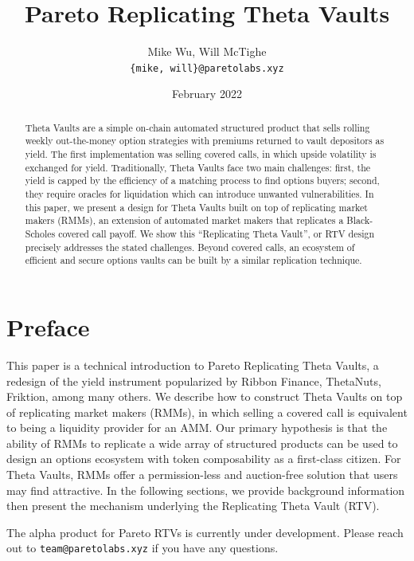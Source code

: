 \documentclass[hidelinks, 12pt]{article}
\title{Pareto Replicating Theta Vaults}
\author{Mike Wu, Will McTighe \\ \small\texttt{\{mike, will\}@paretolabs.xyz}}
\date{February 2022}
\begin{document}
\maketitle

\tableofcontents

\begin{abstract}
Theta Vaults are a simple on-chain automated structured product that sells rolling weekly out-the-money option strategies with premiums returned to vault depositors as yield. The first implementation was selling covered calls, in which upside volatility is exchanged for yield.
Traditionally, Theta Vaults face two main challenges: first, the yield is capped by the efficiency of a matching process to find options buyers; second, they require oracles for liquidation which can introduce unwanted vulnerabilities.
In this paper, we present a design for Theta Vaults built on top of replicating market makers (RMMs), an extension of automated market makers that replicates a Black-Scholes covered call payoff.
We show this ``Replicating Theta Vault'', or RTV design precisely addresses the stated challenges.
Beyond covered calls, an ecosystem of efficient and secure options vaults can be built by a similar replication technique.
\end{abstract}

\section{Preface}

This paper is a technical introduction to Pareto Replicating Theta Vaults, a redesign of the yield instrument popularized by Ribbon Finance, ThetaNuts, Friktion, among many others. We describe how to construct Theta Vaults on top of replicating market makers (RMMs), in which selling a covered call is equivalent to being a liquidity provider for an AMM. Our primary hypothesis is that the ability of RMMs to replicate a wide array of structured products can be used to design an options ecosystem with token composability as a first-class citizen. For Theta Vaults, RMMs offer a permission-less and auction-free solution that users may find attractive. In the following sections, we provide background information then present the mechanism underlying the Replicating Theta Vault (RTV).

The alpha product for Pareto RTVs is currently under development. Please reach out to \texttt{team@paretolabs.xyz} if you have any questions.
\end{document}
